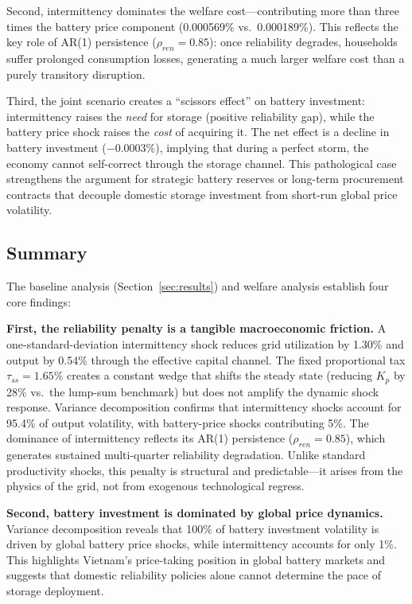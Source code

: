 \documentclass[12pt, a4paper]{article}
\begin{document}
Second, intermittency dominates the welfare cost---contributing more than three times the battery price component (0.000569\% vs.\ 0.000189\%). This reflects the key role of AR(1) persistence ($\rho_{ren}=0.85$): once reliability degrades, households suffer prolonged consumption losses, generating a much larger welfare cost than a purely transitory disruption.

Third, the joint scenario creates a ``scissors effect'' on battery investment: intermittency raises the \textit{need} for storage (positive reliability gap), while the battery price shock raises the \textit{cost} of acquiring it. The net effect is a decline in battery investment ($-0.0003\%$), implying that during a perfect storm, the economy cannot self-correct through the storage channel. This pathological case strengthens the argument for strategic battery reserves or long-term procurement contracts that decouple domestic storage investment from short-run global price volatility.

\subsection{Summary}

The baseline analysis (Section~\ref{sec:results}) and welfare analysis establish four core findings:

\textbf{First, the reliability penalty is a tangible macroeconomic friction.} A one-standard-deviation intermittency shock reduces grid utilization by 1.30\% and output by 0.54\% through the effective capital channel. The fixed proportional tax $\tau_{ss}=1.65\%$ creates a constant wedge that shifts the steady state (reducing $K_p$ by 28\% vs.\ the lump-sum benchmark) but does not amplify the dynamic shock response. Variance decomposition confirms that intermittency shocks account for 95.4\% of output volatility, with battery-price shocks contributing 5\%. The dominance of intermittency reflects its AR(1) persistence ($\rho_{ren}=0.85$), which generates sustained multi-quarter reliability degradation. Unlike standard productivity shocks, this penalty is structural and predictable---it arises from the physics of the grid, not from exogenous technological regress.

\textbf{Second, battery investment is dominated by global price dynamics.} Variance decomposition reveals that 100\% of battery investment volatility is driven by global battery price shocks, while intermittency accounts for only 1\%. This highlights Vietnam's price-taking position in global battery markets and suggests that domestic reliability policies alone cannot determine the pace of storage deployment.
\end{document}
